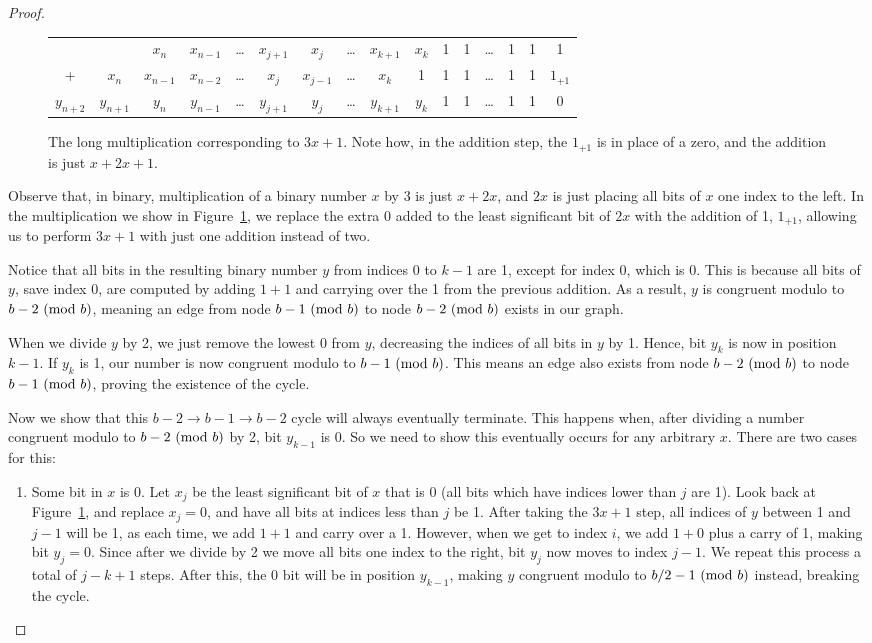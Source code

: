 \begin{proof}
\begin{figure}
\begin{tabular}{*{16}c}
  & & $ x_{n}$  & $ x_{n-1}$  & \ldots & $ x_{j+1}$  & $ x_{j}$  & \ldots & $ x_{k+1}$  & $ x_{k}$  & 1 & 1 & \ldots & 1 & 1 & 1 \\
  + & $ x_{n}$  & $ x_{n-1}$  & $ x_{n-2}$  & \ldots & $ x_{j}$  & $ x_{j-1}$  & \ldots & $ x_{k}$  & 1 & 1 & 1 & \ldots & 1 & 1 & $1_{+1}$  \\
  \hline
  $ y_{n+2}$  & $ y_{n+1}$  & $ y_{n}$  & $ y_{n-1}$  & \ldots & $ y_{j+1}$  & $ y_{j}$  & \ldots & $ y_{k+1}$  & $ y_{k}$  & 1 & 1 & \ldots & 1 & 1 & 0 
\end{tabular}
\caption{The long multiplication corresponding to $3x + 1$. Note how, in the addition step, the $1_{+1}$ is in place of a zero, and the addition is just $x + 2x + 1$.}
\label{fig:mul}
\end{figure}
Observe that, in binary, multiplication of a binary number $x$ by 3 is just $x + 2x$, and $2x$ is just placing all bits of $x$ one index to the left. In the multiplication we show in Figure~\ref{fig:mul}, we replace the extra 0 added to the least significant bit of $2x$ with the addition of 1, $1_{+1}$, allowing us to perform $3x+1$ with just one addition instead of two. \par
Notice that all bits in the resulting binary number $y$ from indices 0 to $k-1$ are 1, except for index 0, which is 0. This is because all bits of $y$, save index 0, are computed by adding $1+1$ and carrying over the 1 from the previous addition. As a result, $y$ is congruent modulo to $b-2 \ (\mathrm{mod}\ b)$, meaning an edge from node $b-1 \ (\mathrm{mod}\ b)$ to node $b-2 \ (\mathrm{mod}\ b)$ exists in our graph.\par
When we divide $y$ by 2, we just remove the lowest 0 from $y$, decreasing the indices of all bits in $y$ by 1. Hence, bit $y_k$ is now in position $k-1$. If $y_k$ is 1, our number is now congruent modulo to $b-1 \ (\mathrm{mod}\ b)$. This means an edge also exists from node $b-2 \ (\mathrm{mod}\ b)$ to node $b-1 \ (\mathrm{mod}\ b)$, proving the existence of the cycle. \par
Now we show that this $b-2 \rightarrow b-1 \rightarrow b-2$ cycle will always eventually terminate. This happens when, after dividing a number congruent modulo to $b-2 \ (\mathrm{mod}\ b)$ by 2, bit $y_{k-1}$ is 0. So we need to show this eventually occurs for any arbitrary $x$. There are two cases for this:
\begin{enumerate}
    \item Some bit in $x$ is 0. Let $x_j$ be the least significant bit of $x$ that is 0 (all bits which have indices lower than $j$ are 1). Look back at Figure~\ref{fig:mul}, and replace $x_j = 0$, and have all bits at indices less than $j$ be 1. After taking the $3x+1$ step, all indices of $y$ between 1 and $j-1$ will be 1, as each time, we add $1 + 1$ and carry over a 1. However, when we get to index $i$, we add $1 + 0$ plus a carry of 1, making bit $y_j = 0$. Since after we divide by 2 we move all bits one index to the right, bit $y_j$ now moves to index $j-1$. We repeat this process a total of $j-k+1$ steps. After this, the 0 bit will be in position $y_{k-1}$, making $y$ congruent modulo to $b/2 - 1 \ (\mathrm{mod}\ b)$ instead, breaking the cycle.

\end{enumerate}
\end{proof}
